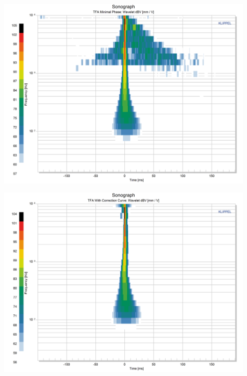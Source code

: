 \documentclass{report}
\begin{document}
\begin{minipage}{0.248\textwidth}
\begin{center}
	\includegraphics[width=0.95\textwidth]{RoomComp/Sonograph_MinPhase} 
    \captionsetup{hypcap=false} 
	\label{fig:comp_minphase}
\end{center}
\end{minipage}
\begin{minipage}{0.248\textwidth}
\begin{center}
	\includegraphics[width=0.95\textwidth]{RoomComp/Sonograph_RoomCor} 
    \captionsetup{hypcap=false} 
	\label{fig:comp_RoomCor}
\end{center}
\end{minipage}
\vspace{0.1cm}
\end{document}
